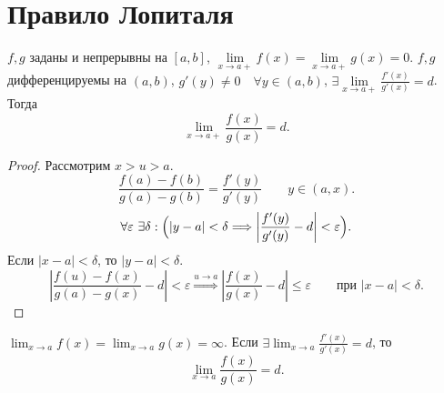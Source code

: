 \documentclass[11pt]{book}
\renewcommand{\le}{\leqslant}
\theoremstyle{definition}
\theoremstyle{plain}
\theoremstyle{plain}
\theoremstyle{definition}
\theoremstyle{remark}
\begin{document}
\section{Правило Лопиталя}
\begin{thm}
    $ f, g$ заданы и непрерывны на $ [a, b]$, $ \lim\limits_{x \to  a+}f(x) = \lim\limits_{x \to a+}g(x) = 0$.  $f, g $ дифференцируемы на  $ (a, b)$,   $ g'(y) \ne 0 \quad \forall  y \in (a, b)$, $ \exists \lim\limits_{x \to a+} \frac{f'(x)}{g'(x)} = d $.
    Тогда 
    \[
	\lim_{x \to a+}\frac{f(x)}{g(x)} = d 
    .\] 
\end{thm}
\begin{proof}
    Рассмотрим $ x > u > a$.
     \[
	 \frac{f(a) - f(b)}{g(a)-g(b)} = \frac{f'(y)}{g'(y)} \qquad y \in (a, x)
    .\] 
    \[
	\forall \varepsilon ~\exists \delta: \Bigl(|y -a| < \delta \Longrightarrow \left| \frac{f'(y)}{g'(y)} - d \right| < \varepsilon \Bigr)
    .\] 
    Если $ |x-a| < \delta $, то $ |y -a|<\delta$. 
    \[
	\left| \frac{f(u)-f(x)}{g(a) -g(x)} - d \right| < \varepsilon \stackrel{u \to  a} \Longrightarrow \left| \frac{f(x)}{g(x)} -d \right| \le \varepsilon \qquad\text{при } |x-a|<\delta
    .\] 
\end{proof}
\begin{thm}
    $ \lim_{x \to  a}f(x)  = \lim_{x \to a}g(x) = \infty $. Если $ \exists \lim_{x \to  a} \frac{f'(x)}{g'(x)} = d $, то 
     \[
	 \lim_{x \to  a} \frac{f(x)}{g(x)} = d
    .\] 
\end{thm}
\end{document}
